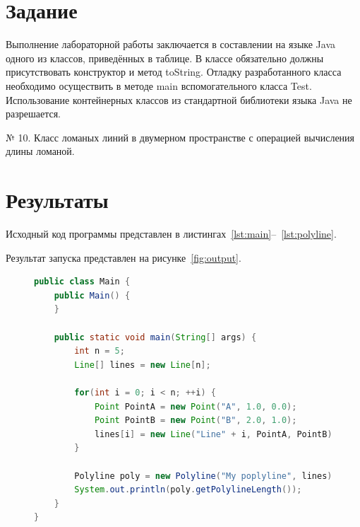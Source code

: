\documentclass[a4paper, 14pt]{extarticle}
\begin{document}
\renewcommand{\ttdefault}{pcr}

\setlength{\tabcolsep}{3pt}
\newpage
\setcounter{page}{2}

\section{Задание}\label{Sect::task}

Выполнение лабораторной работы заключается в составлении на языке Java одного из
классов, приведённых в таблице. В классе обязательно должны присутствовать конструктор и
метод toString.
Отладку разработанного класса необходимо осуществить в методе main
вспомогательного класса Test. Использование контейнерных классов из стандартной библиотеки
языка Java не разрешается.

№ 10. Класс ломаных линий в двумерном пространстве с операцией вычисления длины ломаной.

\section{Результаты}\label{Sect::res}

Исходный код программы представлен в листингах~\ref{lst:main}--~\ref{lst:polyline}.

Результат запуска представлен на рисунке~\ref{fig:output}.


\begin{figure}[!htb]
\begin{lstlisting}[language=Java,caption={Класс Main},label={lst:main}]
public class Main {
    public Main() {
    }

    public static void main(String[] args) {
        int n = 5;
        Line[] lines = new Line[n];

        for(int i = 0; i < n; ++i) {
            Point PointA = new Point("A", 1.0, 0.0);
            Point PointB = new Point("B", 2.0, 1.0);
            lines[i] = new Line("Line" + i, PointA, PointB);
        }

        Polyline poly = new Polyline("My poplyline", lines);
        System.out.println(poly.getPolylineLength());
    }
}

\end{lstlisting}
\end{figure}

\newpage
\end{document}
